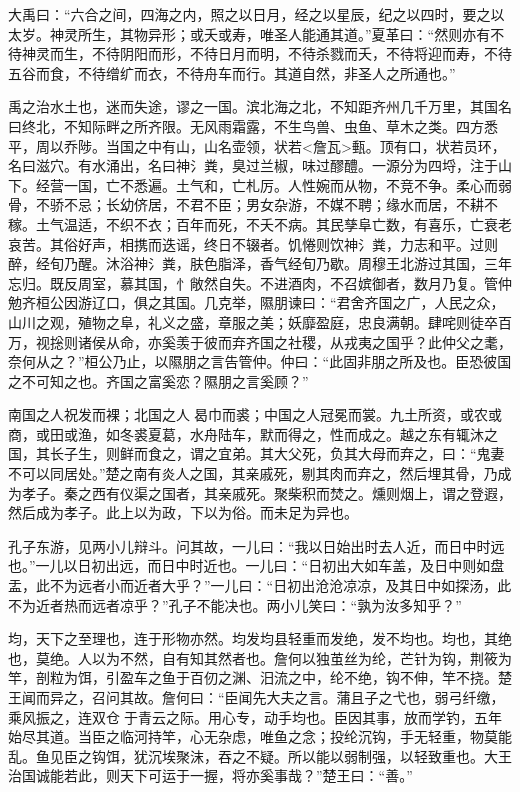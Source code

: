 \documentclass[]{article}
\begin{document}
大禹曰：``六合之间，四海之内，照之以日月，经之以星辰，纪之以四时，要之以太岁。神灵所生，其物异形；或夭或寿，唯圣人能通其道。''夏革曰：``然则亦有不待神灵而生，不待阴阳而形，不待日月而明，不待杀戮而夭，不待将迎而寿，不待五谷而食，不待缯纩而衣，不待舟车而行。其道自然，非圣人之所通也。''

禹之治水土也，迷而失途，谬之一国。滨北海之北，不知距齐州几千万里，其国名曰终北，不知际畔之所齐限。无风雨霜露，不生鸟兽、虫鱼、草木之类。四方悉平，周以乔陟。当国之中有山，山名壶领，状若\textless{}詹瓦\textgreater{}甀。顶有口，状若员环，名曰滋穴。有水涌出，名曰神氵粪，臭过兰椒，味过醪醴。一源分为四埒，注于山下。经营一国，亡不悉遍。土气和，亡札厉。人性婉而从物，不竞不争。柔心而弱骨，不骄不忌；长幼侪居，不君不臣；男女杂游，不媒不聘；缘水而居，不耕不稼。土气温适，不织不衣；百年而死，不夭不病。其民孳阜亡数，有喜乐，亡衰老哀苦。其俗好声，相携而迭谣，终日不辍者。饥惓则饮神氵粪，力志和平。过则醉，经旬乃醒。沐浴神氵粪，肤色脂泽，香气经旬乃歇。周穆王北游过其国，三年忘归。既反周室，慕其国，忄敞然自失。不进酒肉，不召嫔御者，数月乃复。管仲勉齐桓公因游辽口，俱之其国。几克举，隰朋谏曰：``君舍齐国之广，人民之众，山川之观，殖物之阜，礼义之盛，章服之美；妖靡盈庭，忠良满朝。肆咤则徒卒百万，视捴则诸侯从命，亦奚羡于彼而弃齐国之社稷，从戎夷之国乎？此仲父之耄，奈何从之？''桓公乃止，以隰朋之言告管仲。仲曰：``此固非朋之所及也。臣恐彼国之不可知之也。齐国之富奚恋？隰朋之言奚顾？''

南国之人祝发而裸；北国之人曷巾而裘；中国之人冠冕而裳。九土所资，或农或商，或田或渔，如冬裘夏葛，水舟陆车，默而得之，性而成之。越之东有辄沐之国，其长子生，则鲜而食之，谓之宜弟。其大父死，负其大母而弃之，曰：``鬼妻不可以同居处。''楚之南有炎人之国，其亲戚死，剔其肉而弃之，然后埋其骨，乃成为孝子。秦之西有仪渠之国者，其亲戚死。聚柴积而焚之。燻则烟上，谓之登遐，然后成为孝子。此上以为政，下以为俗。而未足为异也。

孔子东游，见两小儿辩斗。问其故，一儿曰：``我以日始出时去人近，而日中时远也。''一儿以日初出远，而日中时近也。一儿曰：``日初出大如车盖，及日中则如盘盂，此不为远者小而近者大乎？''一儿曰：``日初出沧沧凉凉，及其日中如探汤，此不为近者热而远者凉乎？''孔子不能决也。两小儿笑曰：``孰为汝多知乎？''

均，天下之至理也，连于形物亦然。均发均县轻重而发绝，发不均也。均也，其绝也，莫绝。人以为不然，自有知其然者也。詹何以独茧丝为纶，芒针为钩，荆筱为竿，剖粒为饵，引盈车之鱼于百仞之渊、汨流之中，纶不绝，钩不伸，竿不挠。楚王闻而异之，召问其故。詹何曰：``臣闻先大夫之言。蒲且子之弋也，弱弓纤缴，乘风振之，连双仓于青云之际。用心专，动手均也。臣因其事，放而学钓，五年始尽其道。当臣之临河持竿，心无杂虑，唯鱼之念；投纶沉钩，手无轻重，物莫能乱。鱼见臣之钩饵，犹沉埃聚沫，吞之不疑。所以能以弱制强，以轻致重也。大王治国诚能若此，则天下可运于一握，将亦奚事哉？''楚王曰：``善。''
\end{document}
